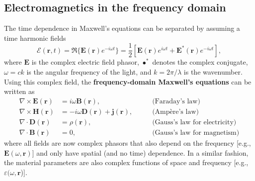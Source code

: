 \subsection*{Electromagnetics in the frequency domain}

The time dependence in Maxwell's equations can be separated by assuming a
time harmonic fields
\begin{equation}
 \bm{\mathcal{E}}(\mathbf{r}, t) = \Re \{ \mathbf{E}(\mathbf{r}) e^{-i\omega
 t} \}= \frac{1}{2}\left[ \mathbf{E}(\mathbf{r}) e^{i\omega t} +
 \mathbf{E}^*(\mathbf{r}) e^{-i\omega t}\right],
\end{equation}
where $\mathbf{E}$ is the complex electric field phasor, $\bullet^*$ denotes the complex conjugate, $\omega=ck$ is the angular
frequency of the light, and $k=2\pi/\lambda$ is the wavenumber.
Using this complex field, the \textbf{frequency-domain Maxwell's equations} can be written as
\begin{align}
    \nabla \times \mathbf{E}(\mathbf{r}) & = i\omega \mathbf{B}(\mathbf{r}),
 \quad \quad                          & \text{(Faraday's law)} \label{eq:curlE_freq}                                   \\
    \nabla \times \mathbf{H}(\mathbf{r}) & = -i\omega \mathbf{D}(\mathbf{r}) +
 \mathbf{j}(\mathbf{r}), \quad \quad  & \text{(Ampère's law)}
    \label{eq:curlH_freq}                                                                                                 \\
    \nabla \cdot \mathbf{D}(\mathbf{r})  & = \rho(\mathbf{r}), \quad \quad
                                         & \text{(Gauss's law for electricity)} \label{eq:divD_freq}                      \\
    \nabla \cdot \mathbf{B}(\mathbf{r})  & = 0, \quad \quad                                          & \text{(Gauss's law
 for magnetism)} \label{eq:divB_freq}
\end{align}
where all fields are now complex phasors that also depend on the frequency
[e.g., $\mathbf{E}(\omega, \mathbf{r})$] and only have spatial (and no time) dependence. In a
similar fashion,
the material parameters are also complex functions of space and frequency [e.g.,
$\varepsilon(\omega, \mathbf{r}$)].

